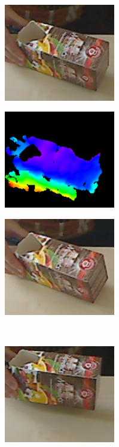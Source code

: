 \begin{figure}[tbh]
\centering
\begin{subfigure}[b]{.32\linewidth}
	\centering
	\includegraphics[width=137pt]{figures/tiny_vis_153_left.png}
  \end{subfigure}
\begin{subfigure}[b]{.32\linewidth}
	\centering
	\includegraphics[width=137pt]{figures/tiny_vis_153.png}
  \end{subfigure}
\begin{subfigure}[b]{.32\linewidth}
	\centering
	\includegraphics[width=137pt]{figures/tiny_vis_153_right.png}
  \end{subfigure} \\
  \begin{subfigure}[b]{.32\linewidth}
	\centering
	\includegraphics[width=137pt]{figures/tiny_vis_76_left.png}

\end{subfigure}
\end{figure}
